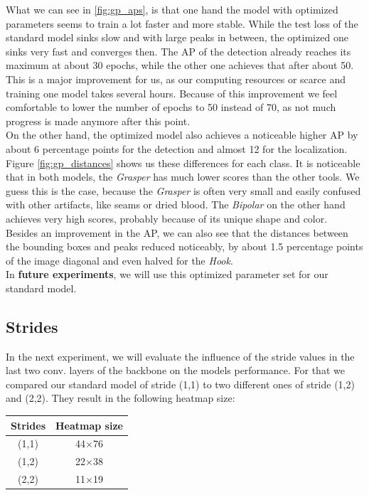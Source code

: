 What we can see in \ref{fig:gp_aps}, is that one hand the model with optimized parameters seems to train a lot faster and more stable. While the test loss of the standard model sinks slow and with large peaks in between, the optimized one sinks very fast and converges then. The AP of the detection already reaches its maximum at about 30 epochs, while the other one achieves that after about 50. This is a major improvement for us, as our computing resources or scarce and training one model takes several hours. Because of this improvement we feel comfortable to lower the number of epochs to 50 instead of 70, as not much progress is made anymore after this point.\\
On the other hand, the optimized model also achieves a noticeable higher AP by about 6 percentage points for the detection and almost 12 for the localization.
Figure \ref{fig:gp_distances} shows us these differences for each class. It is noticeable that in both models, the \emph{Grasper} has much lower scores than the other tools. We guess this is the case, because the \emph{Grasper} is often very small and easily confused with other artifacts, like seams or dried blood. The \emph{Bipolar} on the other hand achieves very high scores, probably because of its unique shape and color.\\ Besides an improvement in the AP, we can also see that the distances between the bounding boxes and peaks reduced noticeably, by about 1.5 percentage points of the image diagonal and even halved for the \emph{Hook}.\\

In \textbf{future experiments}, we will use this optimized parameter set for our standard model.

\FloatBarrier



\subsection{Strides}
In the next experiment, we will evaluate the influence of the stride values in the last two conv. layers of the backbone on the models performance. For that we compared our standard model of stride (1,1) to two different ones of stride (1,2) and (2,2). They result in the following heatmap size:

\begin{center}
	\begin{tabular}{ c | c }
		Strides & Heatmap size\\
		\hline  
		(1,1) & 44$\times$76\\
		(1,2) & 22$\times$38\\
		(2,2) & 11$\times$19\\
	\end{tabular}
\end{center}

